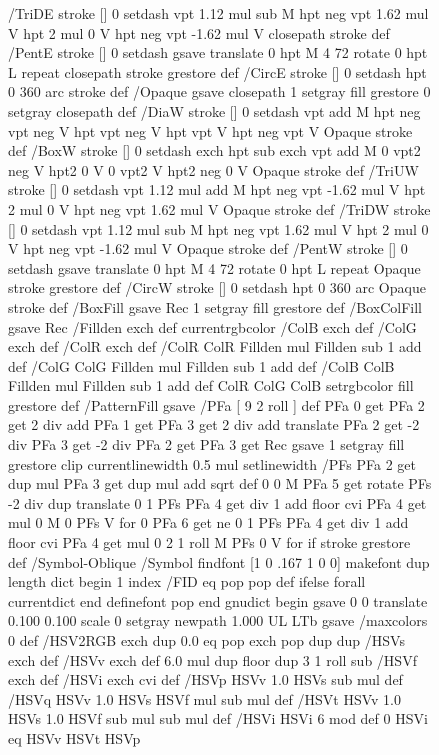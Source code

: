 \documentclass{LMCS}
\begin{document}
\begin{figure}[!tbp]
{{{/TriDE { stroke [] 0 setdash vpt 1.12 mul sub M
  hpt neg vpt 1.62 mul V
  hpt 2 mul 0 V
  hpt neg vpt -1.62 mul V closepath stroke } def
/PentE { stroke [] 0 setdash gsave
  translate 0 hpt M 4 {72 rotate 0 hpt L} repeat
  closepath stroke grestore } def
/CircE { stroke [] 0 setdash 
  hpt 0 360 arc stroke } def
/Opaque { gsave closepath 1 setgray fill grestore 0 setgray closepath } def
/DiaW { stroke [] 0 setdash vpt add M
  hpt neg vpt neg V hpt vpt neg V
  hpt vpt V hpt neg vpt V Opaque stroke } def
/BoxW { stroke [] 0 setdash exch hpt sub exch vpt add M
  0 vpt2 neg V hpt2 0 V 0 vpt2 V
  hpt2 neg 0 V Opaque stroke } def
/TriUW { stroke [] 0 setdash vpt 1.12 mul add M
  hpt neg vpt -1.62 mul V
  hpt 2 mul 0 V
  hpt neg vpt 1.62 mul V Opaque stroke } def
/TriDW { stroke [] 0 setdash vpt 1.12 mul sub M
  hpt neg vpt 1.62 mul V
  hpt 2 mul 0 V
  hpt neg vpt -1.62 mul V Opaque stroke } def
/PentW { stroke [] 0 setdash gsave
  translate 0 hpt M 4 {72 rotate 0 hpt L} repeat
  Opaque stroke grestore } def
/CircW { stroke [] 0 setdash 
  hpt 0 360 arc Opaque stroke } def
/BoxFill { gsave Rec 1 setgray fill grestore } def
/BoxColFill {
  gsave Rec
  /Fillden exch def
  currentrgbcolor
  /ColB exch def /ColG exch def /ColR exch def
  /ColR ColR Fillden mul Fillden sub 1 add def
  /ColG ColG Fillden mul Fillden sub 1 add def
  /ColB ColB Fillden mul Fillden sub 1 add def
  ColR ColG ColB setrgbcolor
  fill grestore } def
/PatternFill { gsave /PFa [ 9 2 roll ] def
    PFa 0 get PFa 2 get 2 div add PFa 1 get PFa 3 get 2 div add translate
    PFa 2 get -2 div PFa 3 get -2 div PFa 2 get PFa 3 get Rec
    gsave 1 setgray fill grestore clip
    currentlinewidth 0.5 mul setlinewidth
    /PFs PFa 2 get dup mul PFa 3 get dup mul add sqrt def
    0 0 M PFa 5 get rotate PFs -2 div dup translate
	0 1 PFs PFa 4 get div 1 add floor cvi
	{ PFa 4 get mul 0 M 0 PFs V } for
    0 PFa 6 get ne {
	0 1 PFs PFa 4 get div 1 add floor cvi
	{ PFa 4 get mul 0 2 1 roll M PFs 0 V } for
    } if
    stroke grestore } def
/Symbol-Oblique /Symbol findfont [1 0 .167 1 0 0] makefont
dup length dict begin {1 index /FID eq {pop pop} {def} ifelse} forall
currentdict end definefont pop
end
gnudict begin
gsave
0 0 translate
0.100 0.100 scale
0 setgray
newpath
1.000 UL
LTb
gsave /maxcolors 0 def
/HSV2RGB {  exch dup 0.0 eq {pop exch pop dup dup} { /HSVs exch def /HSVv exch def 6.0 mul dup floor dup 3 1 roll sub
     /HSVf exch def /HSVi exch cvi def /HSVp HSVv 1.0 HSVs sub mul def
	 /HSVq HSVv 1.0 HSVs HSVf mul sub mul def 
	 /HSVt HSVv 1.0 HSVs 1.0 HSVf sub mul sub mul def
	 /HSVi HSVi 6 mod def 0 HSVi eq {HSVv HSVt HSVp}
}}}}}
\end{figure}
\end{document}
